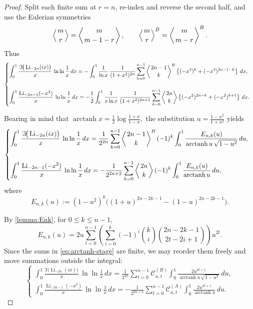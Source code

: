 \documentclass[11pt,twoside]{article}
\numberwithin{equation}{section}
\begin{document}
\begin{proof}
Split each finite sum at $r=n$, re-index and reverse the second half, and use the Eulerian symmetries \cite{FulmanLeeKimPetersen2021}
\[
\left\langle{m\atop r}\right\rangle=\left\langle{m\atop m-1-r}\right\rangle,
\qquad
\left\langle{m\atop r}\right\rangle^{B}=\left\langle{m\atop m-r}\right\rangle^{B}.
\]
Thus
\[
\begin{cases}
\displaystyle
\int_{0}^{1}
\frac{\Im\!\big(\operatorname{Li}_{-2n}(ix)\big)}{x}\,
\ln\ln\frac{1}{x}\,dx
=
-\displaystyle
\int_{0}^{1}
\frac{1}{\ln x}\,
\frac{1}{(1+x^{2})^{2n}}
\sum_{k=0}^{n-1}
\left\langle{2n-1\atop k}\right\rangle^{B}
\left\{(-x^{2})^{k}+(-x^{2})^{2n-1-k}\right\}\,dx,
\\[2.4em]
\displaystyle
\int_{0}^{1}
\frac{\operatorname{Li}_{-2n-1}(-x^{2})}{x}\,
\ln\ln\frac{1}{x}\,dx
=
-\displaystyle
\frac{1}{2}
\int_{0}^{1}
\frac{1}{x\ln x}\,
\frac{1}{(1+x^{2})^{2n+1}}
\sum_{k=0}^{n-1}
\left\langle{2n\atop k}\right\rangle
\left\{(-x^{2})^{2n-k}+(-x^{2})^{k+1}\right\}\,dx.
\end{cases}
\]

Bearing in mind that
\(\displaystyle
\operatorname{arctanh}x=\frac12\log\frac{1+x}{1-x},
\)
the substitution
\(\displaystyle
u=\frac{1-x^2}{1+x^2}
\) yields
\begin{equation}\label{eq:arctanh-stage}
\begin{cases}
\displaystyle
\int_{0}^{1}
\frac{\Im\!\big(\operatorname{Li}_{-2n}(ix)\big)}{x}\,
\ln\ln\frac{1}{x}\,dx
=
\displaystyle
\frac{1}{2^{2n}}
\sum_{k=0}^{n-1}
\left\langle {2n-1 \atop k}\right\rangle^{B}(-1)^k
\int_{0}^{1}
\frac{E_{n,k}(u)}{\operatorname{arctanh}u\,\sqrt{1-u^{2}}}\,du,
\\[2.6em]
\displaystyle
\int_{0}^{1}
\frac{\operatorname{Li}_{-2n-1}(-x^{2})}{x}\,
\ln\ln\frac{1}{x}\,dx
=
-\displaystyle
\frac{1}{2^{2n+2}}
\sum_{k=0}^{n-1}
\left\langle {2n \atop k}\right\rangle(-1)^k
\int_{0}^{1}
\frac{E_{n,k}(u)}{\operatorname{arctanh}u}\,du,
\end{cases}
\end{equation}
where
\[
E_{n,k}(u):=(1-u^2)^k\Big((1+u)^{2n-2k-1}-(1-u)^{2n-2k-1}\Big).
\]

By \cref{lemma:Enk}, for $0\le k\le n-1$,
\[
E_{n,k}(u)
=
2u\sum_{t=0}^{n-1}
\left(
\sum_{i=0}^{k}
(-1)^i
\binom{k}{i}
\binom{2n-2k-1}{2t-2i+1}
\right)
u^{2t}.
\]
Since the sums in \eqref{eq:arctanh-stage} are finite, we may reorder them freely and move summations outside the integral:
\begin{equation}\label{eq:series-stage}
\begin{cases}
\displaystyle
\int_{0}^{1}
\frac{\Im\!\big(\operatorname{Li}_{-2n}(ix)\big)}{x}\,
\ln\ln\frac{1}{x}\,dx
=
\displaystyle
\frac{1}{2^{2n}}
\sum_{t=0}^{n-1}
\mathcal C^{(B)}_{n,t}
\int_{0}^{1}
\frac{2u^{2t+1}}{\operatorname{arctanh}u\,\sqrt{1-u^{2}}}\,du,
\\[2.6em]
\displaystyle
\int_{0}^{1}
\frac{\operatorname{Li}_{-2n-1}(-x^{2})}{x}\,
\ln\ln\frac{1}{x}\,dx
=
-\displaystyle
\frac{1}{2^{2n+2}}
\sum_{t=0}^{n-1}
\mathcal C^{(A)}_{n,t}
\int_{0}^{1}
\frac{2u^{2t+1}}{\operatorname{arctanh}u}\,du.
\end{cases}
\end{equation}


\end{proof}
\end{document}
